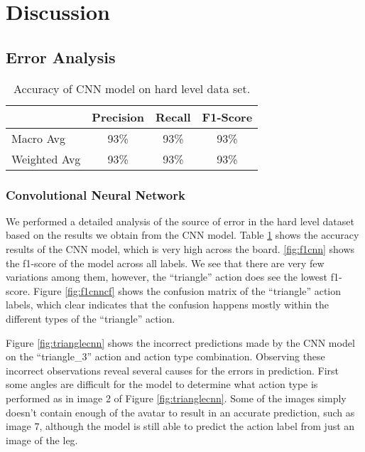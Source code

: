 \documentclass[
	a4paper, %
	10pt, %
	unnumberedsections, %
	twoside, %
]{t0004}
\begin{document}
\section{Discussion}

\subsection{Error Analysis}

\begin{table} %
	\caption{Accuracy of CNN model on hard level data set.}
	\centering
	\begin{tabular}{lccc}
		\toprule
		                  & Precision & Recall & F1-Score \\
		\midrule
		Macro Avg & 93\% & 93\% & 93\% \\
		Weighted Avg & 93\% & 93\% & 93\% \\
		\bottomrule
	\end{tabular}
	\label{tab:accuracycnn}
\end{table}

\subsubsection{Convolutional Neural Network} We performed a detailed analysis of the source of error in the hard level dataset based on the results we obtain from the CNN model. Table \ref{tab:accuracycnn} shows the accuracy results of the CNN model, which is very high across the board. \ref{fig:f1cnn} shows the f1-score of the model across all labels. We see that there are very few variations among them, however, the ``triangle'' action does see the lowest f1-score. Figure \ref{fig:f1cnncf} shows the confusion matrix of the ``triangle'' action labels, which clear indicates that the confusion happens mostly within the different types of the ``triangle'' action.

Figure \ref{fig:trianglecnn} shows the incorrect predictions made by the CNN model on the ``triangle\_3'' action and action type combination. Observing these incorrect observations reveal several causes for the errors in prediction. First some angles are difficult for the model to determine what action type is performed as in image 2 of Figure \ref{fig:trianglecnn}. Some of the images simply doesn't contain enough of the avatar to result in an accurate prediction, such as image 7, although the model is still able to predict the action label from just an image of the leg.
\end{document}
